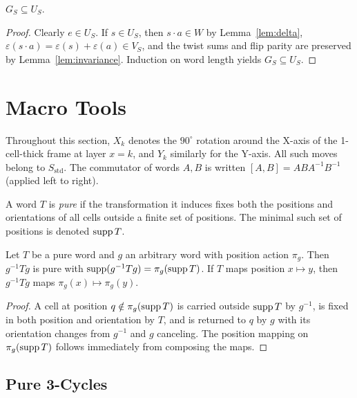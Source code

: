 \documentclass[a4paper,11pt]{article}
\begin{document}
\begin{proposition}\label{prop:necessary}
$G_S\subseteq U_S$.
\end{proposition}

\begin{proof}
Clearly $e\in U_S$. If $s\in U_S$, then $s\cdot a\in W$ by Lemma~\ref{lem:delta}, $\varepsilon(s\cdot a)=\varepsilon(s)+\varepsilon(a)\in V_S$, and the twist sums and flip parity are preserved by Lemma~\ref{lem:invariance}. Induction on word length yields $G_S\subseteq U_S$.
\end{proof}

\section{Macro Tools}\label{sec:tools}

Throughout this section, $X_k$ denotes the $90^\circ$ rotation around the X-axis of the 1-cell-thick frame at layer $x=k$, and $Y_k$ similarly for the Y-axis.
All such moves belong to $S_{\mathrm{std}}$. The commutator of words $A,B$ is written $[A,B]=ABA^{-1}B^{-1}$ (applied left to right).

\begin{definition}
A word $T$ is \emph{pure} if the transformation it induces fixes both the positions and orientations of all cells outside a finite set of positions. The minimal such set of positions is denoted $\operatorname{supp} T$.
\end{definition}

\begin{lemma}[Conjugation]\label{lem:conj}
Let $T$ be a pure word and $g$ an arbitrary word with position action $\pi_g$.
Then $g^{-1}Tg$ is pure with $\operatorname{supp}(g^{-1}Tg)=\pi_g(\operatorname{supp} T)$.
If $T$ maps position $x\mapsto y$, then $g^{-1}Tg$ maps $\pi_g(x)\mapsto\pi_g(y)$.
\end{lemma}

\begin{proof}
A cell at position $q\notin\pi_g(\operatorname{supp} T)$ is carried outside $\operatorname{supp} T$ by $g^{-1}$, is fixed in both position and orientation by $T$, and is returned to $q$ by $g$ with its orientation changes from $g^{-1}$ and $g$ canceling. The position mapping on $\pi_g(\operatorname{supp} T)$ follows immediately from composing the maps.
\end{proof}

\subsection{Pure 3-Cycles}
\end{document}
